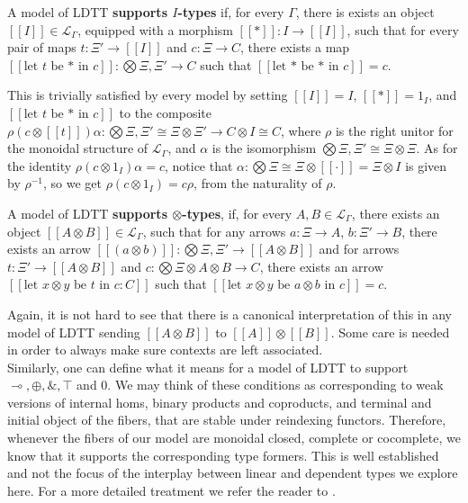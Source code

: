 \begin{defn}
  A model of LDTT \textbf{supports $I$-types} if, for every $\Gamma$, there is exists an object $[[I]] \in \mathcal{L}_{\Gamma}$, equipped with a morphism $[[*]] : I \to [[I]]$, such that for every pair of maps $t : \Xi' \to [[I]]$ and $c : \Xi \to C$, there exists a map $[[\text{let $t$ be * in $c$}]] : \bigotimes \Xi, \Xi' \to C$ such that $[[\text{let * be * in $c$}]] = c$.
\end{defn}
This is trivially satisfied by every model by setting $[[I]] = I$, $[[*]] = 1_{I}$, and $[[\text{let $t$ be * in $c$}]]$ to the composite $\rho (c \otimes [[t]]) \alpha  : \bigotimes \Xi, \Xi' \cong \Xi \otimes \Xi' \to C \otimes I \cong C$, where $\rho$ is the right unitor for the monoidal structure of $\mathcal{L}_{\Gamma}$, and $\alpha$ is the isomorphism $\bigotimes \Xi, \Xi' \cong \Xi \otimes \Xi$. As for the identity $\rho(c \otimes 1_{I}) \alpha = c$, notice that $\alpha : \bigotimes \Xi \cong \Xi \otimes [[\cdot]] = \Xi \otimes I$ is given by $\rho^{-1}$, so we get $\rho (c \otimes 1_I) = c \rho$, from the naturality of $\rho$.\\
\begin{defn}
  A model of LDTT \textbf{supports $\otimes$-types}, if, for every $A, B \in \mathcal{L}_{\Gamma}$, there exists an object $[[A \otimes B]] \in \mathcal{L}_{\Gamma}$, such that for any arrows $a : \Xi \to A$, $b : \Xi' \to B$, there exists an arrow $[[(a \otimes b)]] : \bigotimes \Xi, \Xi' \to [[A \otimes B]]$ and for arrows $t : \Xi' \to [[A \otimes B]]$ and $c : \bigotimes \Xi \otimes A \otimes B \to C$, there exists an arrow $[[\text{let $x \otimes y$ be $t$ in $c : C$}]]$ such that $[[\text{let $x \otimes y$ be $a \otimes b$ in $c$}]] = c$.
\end{defn}
Again, it is not hard to see that there is a canonical interpretation of this in any model of LDTT sending $[[A \otimes B]]$ to $[[A]] \otimes [[B]]$. Some care is needed in order to always make sure contexts are left associated.\\
Similarly, one can define what it means for a model of LDTT to support $\multimap, \oplus, \&, \top$ and $0$. We may think of these conditions as corresponding to weak versions of internal homs, binary products and coproducts, and terminal and initial object of the fibers, that are stable under reindexing functors. Therefore, whenever the fibers of our model are monoidal closed, complete or cocomplete, we know that it supports the corresponding type formers. This is well established and not the focus of the interplay between linear and dependent types we explore here. For a more detailed treatment we refer the reader to \cite{mellies}.

